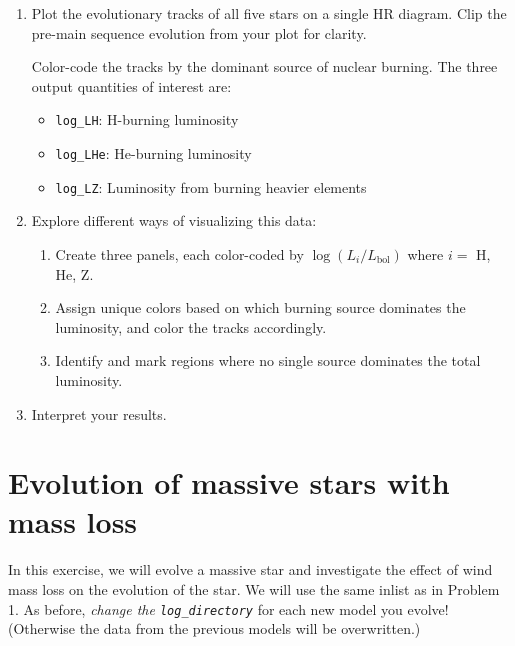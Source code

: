 \documentclass[11pt,a4paper]{article}
\begin{document}
\begin{enumerate}[label=(\alph*)]
    \item Plot the evolutionary tracks of all five stars on a single HR diagram. 
    Clip the pre-main sequence evolution from your plot for clarity.

    Color-code the tracks by the dominant source of nuclear burning. The three output quantities of interest are:
    \begin{itemize}
        \item \texttt{log\_LH}: H-burning luminosity
        \item \texttt{log\_LHe}: He-burning luminosity
        \item \texttt{log\_LZ}: Luminosity from burning heavier elements
    \end{itemize}
    \item Explore different ways of visualizing this data:
    \begin{enumerate}[label=(\alph*)]
        \item Create three panels, each color-coded by $\log (L_i/L_{\text{bol}})$ where $i = $ H, He, Z.
        \item Assign unique colors based on which burning source dominates the luminosity, and color the tracks accordingly.
        \item Identify and mark regions where no single source dominates the total luminosity.
    \end{enumerate}

    \item Interpret your results. 

\end{enumerate}

\section{Evolution of massive stars with mass loss}

In this exercise, we will evolve a massive star and investigate the effect of wind mass loss on the evolution of the star. 
We will use the same inlist as in Problem 1. As before, \emph{change the \texttt{log\_directory}} for each new model you evolve! (Otherwise the data from the previous models will be overwritten.)
\end{document}
